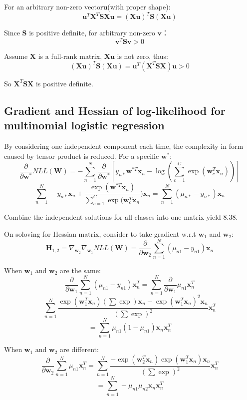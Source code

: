 \documentclass[UTF8]{ctexart}
\begin{document}
For an arbitrary non-zero vector$\textbf{u}$(with proper shape):
$$\textbf{u}^{T}\textbf{X}^{T}\textbf{S}\textbf{X}\textbf{u}=(\textbf{X}\textbf{u})^{T}\textbf{S}(\textbf{X}\textbf{u})$$

Since $\textbf{S}$ is positive definite, for arbitrary non-zero $\textbf{v}$：
$$\textbf{v}^{T}\textbf{S}\textbf{v} > 0$$

Assume $\textbf{X}$ is a full-rank matrix, $\textbf{X}\textbf{u}$ is not zero, thus:
$$(\textbf{X}\textbf{u})^{T}\textbf{S}(\textbf{X}\textbf{u}) = \textbf{u}^{T}(\textbf{X}^{T}\textbf{S}\textbf{X})\textbf{u} > 0$$

So $\textbf{X}^{T}\textbf{S}\textbf{X}$ is positive definite.

\subsection{Gradient and Hessian of log-likelihood for multinomial logistic regression}
By considering one independent component each time, the complexity in form caused by tensor product is reduced. For a specific $\textbf{w}^{*}$:
$$\frac{\partial}{\partial \textbf{w}^{*}}NLL(\textbf{W}) = -\sum_{n=1}^{N}\frac{\partial}{\partial \textbf{w}^{*}} [y_{n*}\textbf{w}^{*T}\textbf{x}_{n}-\log(\sum_{c=1}^{C}\exp(\textbf{w}_{c}^{T}\textbf{x}_{n}))]$$
$$\sum_{n=1}^{N}-y_{n*}\textbf{x}_{n}+\frac{\exp(\textbf{w}^{*T}\textbf{x}_{n})}{\sum_{c=1}^{C}\exp(\textbf{w}_{c}^{T}\textbf{x}_{n}})\textbf{x}_{n}=\sum_{n=1}^{N}(\mu_{n*}-y_{n*})\textbf{x}_{n}$$

Combine the independent solutions for all classes into one matrix yield 8.38. 

On soloving for Hessian matrix, consider to take gradient w.r.t $\textbf{w}_{1}$ and $\textbf{w}_{2}$:
$$\textbf{H}_{1,2}=\nabla_{\textbf{w}_{2}}\nabla_{\textbf{w}_{1}}NLL(\textbf{W})=\frac{\partial}{\partial \textbf{w}_{2}} \sum_{n=1}^{N}(\mu_{n1}-y_{n1})\textbf{x}_{n}  $$

When $\textbf{w}_{1}$ and $\textbf{w}_{2}$ are the same:
$$\frac{\partial}{\partial \textbf{w}_{1}} \sum_{n=1}^{N}(\mu_{n1}-y_{n1})\textbf{x}_{n}^{T}=\sum_{n=1}^{N}\frac{\partial}{\partial \textbf{w}_{1}}\mu_{n1}\textbf{x}_{n}^{T}$$
$$\sum_{n=1}^{N}\frac{\exp(\textbf{w}_{1}^{T}\textbf{x}_{n})(\sum \exp)\textbf{x}_{n}-\exp(\textbf{w}_{1}^{T}\textbf{x}_{n})^{2}\textbf{x}_{n}}{(\sum \exp)^{2}}\textbf{x}_{n}^{T}$$
$$=\sum_{n=1}^{N}\mu_{n1}(1-\mu_{n1})\textbf{x}_{n}\textbf{x}_{n}^{T}$$

When $\textbf{w}_{1}$ and $\textbf{w}_{2}$ are different:
$$\frac{\partial}{\partial \textbf{w}_{2}} \sum_{n=1}^{N}\mu_{n1}\textbf{x}_{n}^{T}=\sum_{n=1}^{N}\frac{-\exp(\textbf{w}_{2}^{T}\textbf{x}_{n})\exp(\textbf{w}_{1}^{T}\textbf{x}_{n})\textbf{x}_{n}}{(\sum\exp)^{2}}\textbf{x}_{n}^{T}$$
$$=\sum_{n=1}^{N}-\mu_{n1}\mu_{n2}\textbf{x}_{n}\textbf{x}_{n}^{T}$$
\end{document}
